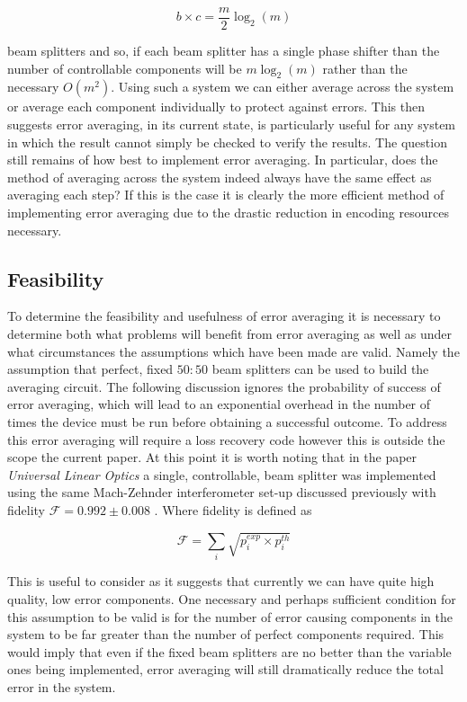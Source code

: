 \documentclass[aps,pra,twocolumn,superscriptaddress,numerical]{revtex4-1}
\begin{document}
		\begin{equation}
		b\times c=\frac{m}{2}\log_{2}(m)
		\end{equation}
		
		
		beam splitters and so, if each beam splitter has a single phase shifter than the number of controllable components will be $m\log_{2}(m)$ rather than the necessary $O\left(m^{2}\right)$. Using such a system we can either average across the system or average each component individually to protect against errors. This then suggests error averaging, in its current state, is particularly useful for any system in which the result cannot simply be checked to verify the results. The question still remains of how best to implement error averaging. In particular, does the method of averaging across the system indeed always have the same effect as averaging each step? If this is the case it is clearly the more efficient method of implementing error averaging due to the drastic reduction in encoding resources necessary.
		
	\subsection{Feasibility\label{Feasibility subsection}}	
		To determine the feasibility and usefulness of error averaging it is necessary to determine both what problems will benefit from error averaging as well as under what circumstances the assumptions which have been made are valid. Namely the assumption that perfect, fixed $50:50$ beam splitters can be used to build the averaging circuit. The following discussion ignores the probability of success of error averaging, which will lead to an exponential overhead in the number of times the device must be run before obtaining a successful outcome. To address this error averaging will require a loss recovery code \cite{OQC} however this is outside the scope the current paper. At this point it is worth noting that in the paper  \textit{Universal Linear Optics} a single, controllable, beam splitter was implemented using the same Mach-Zehnder interferometer set-up discussed previously with fidelity $\mathcal{F}=0.992\pm0.008$ \cite{ULO}. Where fidelity is defined as 
		
		\begin{equation}
			\mathcal{F}=\sum_{i}\sqrt{p_{i}^{exp}\times p_{i}^{th}}
		\end{equation}
		
		
		This is useful to consider as it suggests that currently we can have quite high quality, low error components. One necessary and perhaps sufficient condition for this assumption to be valid is for the number of error causing components in the system to be far greater than the number of perfect components required. This would imply that even if the fixed beam splitters are no better than the variable ones being implemented, error averaging will still dramatically reduce the total error in the system. 
		
\end{document}
